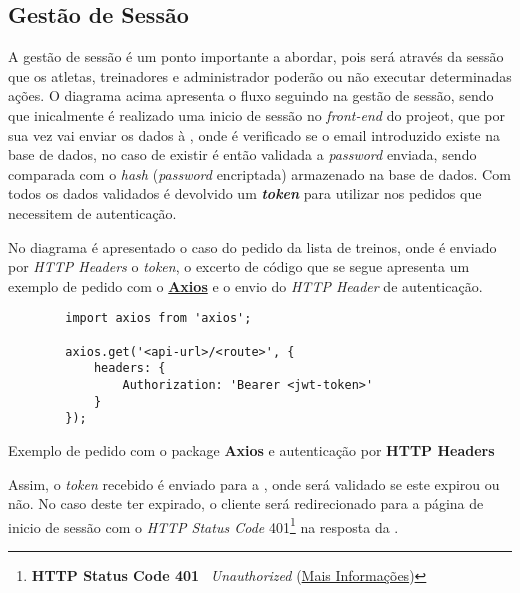 \subsection{Gestão de Sessão}
\label{sessionSequenceDiagram}


A gestão de sessão é um ponto importante a abordar, pois será através da sessão que os atletas, treinadores e administrador poderão ou não executar determinadas ações. O diagrama acima apresenta o fluxo seguindo  na gestão de sessão, sendo que inicalmente é realizado uma inicio de sessão no \textit{front-end} do projeot, que por sua vez vai enviar os dados à \textbf{}, onde é verificado se o email introduzido existe na base de dados, no caso de existir é então validada a \textit{password} enviada, sendo comparada com o \textit{hash} (\textit{password} encriptada) armazenado na base de dados. Com todos os dados validados é devolvido um \textbf{ \textit{token}} para utilizar nos pedidos que necessitem de autenticação.

No diagrama é apresentado o caso do pedido da lista de treinos, onde é enviado por \textit{HTTP Headers} o \textit{token}, o excerto de código que se segue apresenta um exemplo de pedido com o \textit{} \textbf{\href{https://github.com/axios/axios}{Axios}} e o envio do \textit{HTTP Header} de autenticação.

\begin{longlisting}
	\begin{verbatim}
		import axios from 'axios';

		axios.get('<api-url>/<route>', {
			headers: {
				Authorization: 'Bearer <jwt-token>'
			}
		});
	\end{verbatim}

	\caption{Exemplo de pedido com o package \textbf{Axios} e autenticação por \textbf{HTTP Headers}}
\end{longlisting}

Assim, o \textit{token} \textbf{} recebido é enviado para a \textbf{}, onde será validado se este expirou ou não. No caso deste ter expirado, o cliente será redirecionado para a página de inicio de sessão com o \textit{HTTP Status Code} 401\footnote{\textbf{HTTP Status Code 401 \textemdash} ~\textit{Unauthorized} (\href{https://developer.mozilla.org/pt-BR/docs/Web/HTTP/Status/401}{Mais Informações})} na resposta da \textbf{}.
